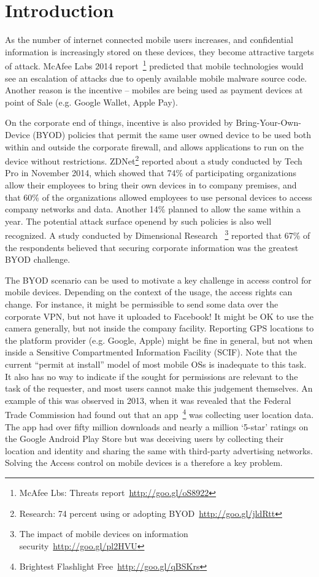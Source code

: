 \section{Introduction}
\label{intro}
As the number of internet connected mobile users increases, and confidential information is increasingly stored on these devices, they become attractive targets of attack. McAfee Labs 2014 report~\footnote{McAfee Lbs: Threats report~\url{http://goo.gl/oS8922}} predicted that mobile technologies would see an escalation of attacks due to openly available mobile malware source code. Another reason is the incentive -- mobiles are being used as payment devices at point of Sale (e.g. Google Wallet, Apple Pay). 

On the corporate end of things, incentive is also provided by  Bring-Your-Own-Device (BYOD) policies that permit the same user owned device to be used both within and outside the corporate firewall, and allows applications to run on the device without restrictions. ZDNet\footnote{Research: 74 percent using or adopting BYOD~\url{http://goo.gl/jldRtt}} reported about a study conducted by Tech Pro in November 2014, which showed that 74\% of participating organizations allow their employees to bring their own devices in to company premises, and that  60\% of the organizations allowed employees to use personal devices to access company networks and data. Another 14\% planned to allow the same within a year.  The potential attack surface openend by such policies is also well recognized.  A study conducted by Dimensional Research ~\footnote{The impact of mobile devices on information security~\url{http://goo.gl/pl2HVU}} reported that  67\% of the respondents believed that securing corporate information was the greatest BYOD challenge. 

The BYOD scenario can be used to motivate a key challenge in access control for mobile devices. Depending on the context of the usage, the access rights can change. For instance, it might be permissible to send some data over the corporate VPN, but not have it uploaded to Facebook! It might be OK to use the camera generally, but not inside the company facility. Reporting GPS locations to the platform provider (e.g. Google, Apple) might be fine in general, but not when inside a Sensitive Compartmented Information Facility (SCIF). Note that the current ``permit at install'' model of most mobile OSs is inadequate to this task. It also has no way to indicate if the sought for permissions are relevant to the task of the requester, and most users cannot make this judgement themselves. An example of this was observed in 2013, when it was revealed that the Federal Trade Commission had found out that an app~\footnote{Brightest Flashlight Free~\url{http://goo.gl/qBSKrs}} was collecting user location data. The app had over fifty million downloads and nearly a million `5-star' ratings on the Google Android Play Store but was deceiving users by collecting their location and identity and sharing the same with third-party advertising networks. Solving the Access control on mobile devices is a therefore a key problem.

